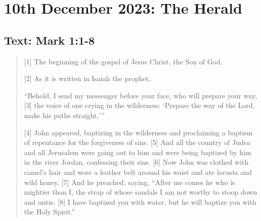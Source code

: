 \setcounter{figure}{0}

\section{10th December 2023: The Herald}
\subsection*{Text: Mark 1:1-8}
  \begin{quote}
    [1] The beginning of the gospel of Jesus Christ, the Son of God.

    [2] As it is written in Isaiah the prophet,

    “Behold, I send my messenger before your face,
        who will prepare your way,
    [3] the voice of one crying in the wilderness:
        ‘Prepare the way of the Lord,
        make his paths straight,’”


    [4] John appeared, baptizing in the wilderness and proclaiming a baptism of repentance for the forgiveness of sins. [5] And all the country of Judea and all Jerusalem were going out to him and were being baptized by him in the river Jordan, confessing their sins. [6] Now John was clothed with camel’s hair and wore a leather belt around his waist and ate locusts and wild honey. [7] And he preached, saying, “After me comes he who is mightier than I, the strap of whose sandals I am not worthy to stoop down and untie. [8] I have baptized you with water, but he will baptize you with the Holy Spirit.”
  \end{quote}
